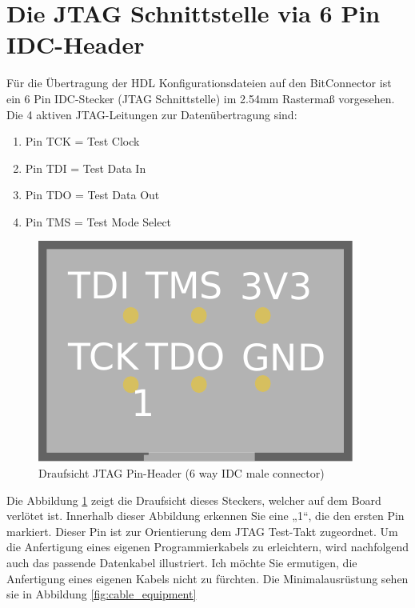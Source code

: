 \documentclass{article}
\begin{document}
\section{Die JTAG Schnittstelle via 6 Pin IDC-Header}

Für die Übertragung der HDL Konfigurationsdateien auf den BitConnector ist ein 6 Pin IDC-Stecker (JTAG Schnittstelle) im 2.54mm Rastermaß vorgesehen. Die 4 aktiven JTAG-Leitungen zur Datenübertragung sind:

\begin{enumerate}
	\item Pin TCK = Test Clock
	\item Pin TDI = Test Data In
	\item Pin TDO = Test Data Out
	\item Pin TMS = Test Mode Select
\end{enumerate}

\begin{figure}[!h]
	\centering
	\includegraphics[width=0.25\linewidth]{Figures/PinHeader6P_male}
	\caption{Draufsicht JTAG Pin-Header (6 way IDC male connector)}
	\label{fig:pinheader}
\end{figure}

\newpage

Die Abbildung \ref{fig:pinheader} zeigt die Draufsicht dieses Steckers, welcher auf dem Board verlötet ist.
Innerhalb dieser Abbildung erkennen Sie eine „1“, die den ersten Pin markiert. Dieser Pin ist zur Orientierung dem JTAG Test-Takt zugeordnet. Um die Anfertigung eines eigenen Programmierkabels zu erleichtern, wird nachfolgend auch das passende Datenkabel illustriert. Ich möchte Sie ermutigen, die Anfertigung eines eigenen Kabels nicht zu fürchten. Die Minimalausrüstung sehen sie in Abbildung \ref{fig:cable_equipment}
\end{document}
